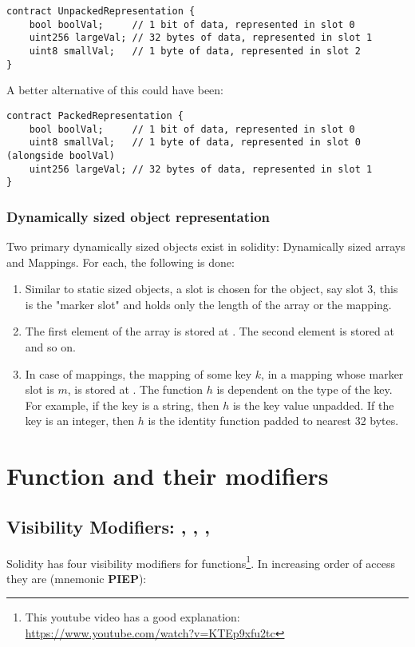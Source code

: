 \begin{lstlisting}[language=Solidity, caption=In-storage representation]
contract UnpackedRepresentation {
    bool boolVal;     // 1 bit of data, represented in slot 0
    uint256 largeVal; // 32 bytes of data, represented in slot 1
    uint8 smallVal;   // 1 byte of data, represented in slot 2
}
\end{lstlisting}

A better alternative of this could have been:
\begin{lstlisting}[language=Solidity, caption=In-storage representation(better)]
contract PackedRepresentation {
    bool boolVal;     // 1 bit of data, represented in slot 0
    uint8 smallVal;   // 1 byte of data, represented in slot 0 (alongside boolVal)
    uint256 largeVal; // 32 bytes of data, represented in slot 1
}
\end{lstlisting}

\subsubsection{Dynamically sized object representation}
Two primary dynamically sized objects exist in solidity: Dynamically sized arrays and Mappings. For each, the following is done:
\begin{enumerate}
    \item Similar to static sized objects, a slot is chosen for the object, say slot 3, this is the "marker slot" and holds only the length of the array or the mapping.
    \item The first element of the array is stored at . The second element is stored at  and so on.
    \item In case of mappings, the mapping of some key $k$, in a mapping whose marker slot is $m$, is stored at . The function $h$ is dependent on the type of the key. For example, if the key is a string, then $h$ is the key value unpadded. If the key is an integer, then $h$ is the identity function padded to nearest 32 bytes.
\end{enumerate}

\section{Function and their modifiers}

\subsection{Visibility Modifiers: , , , }
Solidity has four visibility modifiers for functions\footnote{This youtube video has a good explanation: \href{https://www.youtube.com/watch?v=KTEp9xfu2tc}{https://www.youtube.com/watch?v=KTEp9xfu2tc}}. In increasing order of access they are (mnemonic \textbf{PIEP}):


